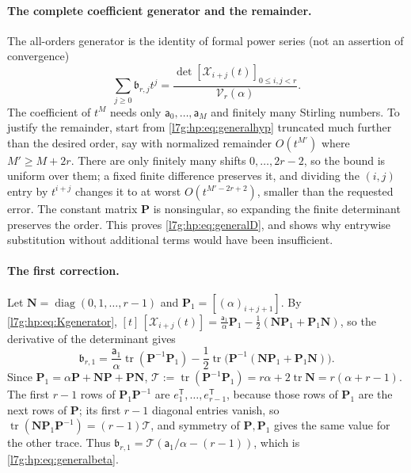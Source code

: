 \documentclass[11pt,letterpaper]{article}
\theoremstyle{remark}\newtheorem{remark}[theorem]{Remark}
\newcounter{l7gtrsavedeq}
\begin{document}
\paragraph{The complete coefficient generator and the remainder.}
The all-orders generator is the identity of formal power series (not an
assertion of convergence)
\begin{equation}\label{l7g:hp:eq:betagenerator}
 \sum_{j\ge0}\mathfrak b_{r,j}t^j
 =\frac{\det[\mathcal X_{i+j}(t)]_{0\le i,j<r}}{\mathcal V_r(\alpha)}.
\end{equation}
The coefficient of $t^M$ needs only $\mathsf a_0,\dots,\mathsf a_M$ and
finitely many Stirling numbers. To justify the remainder, start from
\eqref{l7g:hp:eq:generalhyp} truncated much further than the desired order,
say with normalized remainder $O(t^{M'})$ where $M'\ge M+2r$. There are only
finitely many shifts $0,\dots,2r-2$, so the bound is uniform over them;
a fixed finite difference preserves it, and dividing the $(i,j)$ entry by
$t^{i+j}$ changes it to at worst $O(t^{M'-2r+2})$, smaller than the
requested error. The constant matrix $\mathbf P$ is nonsingular, so
expanding the finite determinant preserves the order. This proves
\eqref{l7g:hp:eq:generalD}, and shows why entrywise substitution without
additional terms would have been insufficient.

\paragraph{The first correction.}
Let $\mathbf N=\operatorname{diag}(0,1,\dots,r-1)$ and
$\mathbf P_1=[(\alpha)_{i+j+1}]$. By \eqref{l7g:hp:eq:Kgenerator},
$[t]\,[\mathcal X_{i+j}(t)]=\frac{\mathsf a_1}{\alpha}\mathbf P_1
-\frac12(\mathbf N\mathbf P_1+\mathbf P_1\mathbf N)$, so the derivative of
the determinant gives
\begin{equation}\label{l7g:hp:eq:tracebeta}
 \mathfrak b_{r,1}=\frac{\mathsf a_1}{\alpha}\operatorname{tr}(\mathbf P^{-1}\mathbf P_1)
 -\frac12\operatorname{tr}\bigl(\mathbf P^{-1}(\mathbf N\mathbf P_1+\mathbf P_1\mathbf N)\bigr).
\end{equation}
Since $\mathbf P_1=\alpha\mathbf P+\mathbf N\mathbf P+\mathbf P\mathbf N$,
$\mathcal T:=\operatorname{tr}(\mathbf P^{-1}\mathbf P_1)=r\alpha+2\operatorname{tr}\mathbf N
=r(\alpha+r-1)$. The first $r-1$ rows of $\mathbf P_1\mathbf P^{-1}$ are
$e_1^{\mathsf T},\dots,e_{r-1}^{\mathsf T}$, because those rows of $\mathbf
P_1$ are the next rows of $\mathbf P$; its first $r-1$ diagonal entries
vanish, so $\operatorname{tr}(\mathbf N\mathbf P_1\mathbf P^{-1})=(r-1)\mathcal T$, and
symmetry of $\mathbf P,\mathbf P_1$ gives the same value for the other
trace. Thus $\mathfrak b_{r,1}=\mathcal T(\mathsf a_1/\alpha-(r-1))$, which
is \eqref{l7g:hp:eq:generalbeta}.
\end{document}

